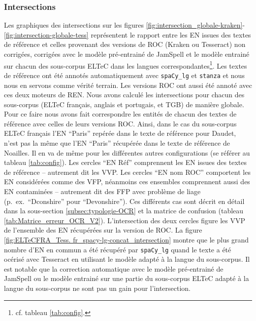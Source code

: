 \subsubsection{Intersections}
\label{intersections}
Les graphiques des intersections sur les figures \ref{fig:intersection_globale-kraken}-\ref{fig:intersection-globale-tess} représentent le rapport entre les EN issues des textes de référence et celles provenant des versions de ROC (Kraken ou Tesseract) non corrigées, corrigées avec le modèle pré-entrainé de JamSpell et le modèle entrainé sur chacun des sous-corpus ELTeC dans les langues correspondantes\footnote{cf. tableau \ref{tab:config}.}. Les textes de référence ont été annotés automatiquement avec \texttt{spaCy\_lg} et \texttt{stanza} et nous nous en servons comme vérité terrain. Les versions ROC ont aussi été annoté avec ces deux moteurs de REN. Nous avons calculé les intersections pour chacun des sous-corpus (ELTeC français, anglais et portugais, et TGB) de manière globale. Pour ce faire nous avons fait correspondre les entités de chacun des textes de référence avec celles de leurs versions ROC. Ainsi, dans le cas du sous-corpus ELTeC français l'EN ``Paris'' repérée dans le texte de référence pour Daudet, n'est pas la même que l'EN ``Paris'' récupérée dans le texte de référence de Noailles. Il en va de même pour les différentes autres configurations (se référer au tableau \ref{tab:config}).
Les cercles ``EN Réf'' comprennent les EN issues des textes de référence -- autrement dit les VVP. Les cercles ``EN nom ROC'' comportent les EN considérées comme des VFP, néanmoins ces ensembles comprennent aussi des EN contaminées -- autrement dit des FFP avec problème de liage (p.\ ex.\ ``Dconshire'' pour ``Devonshire''). Ces différents cas sont décrit en détail dans la sous-section \ref{subsec:typologie-OCR} et la matrice de confusion (tableau \ref{tab:Matrice_erreur_OCR_V2}). L'intersection des deux cercles figure les VVP de l'ensemble des EN récupérées sur la version de ROC.
La figure \ref{fig:ELTeCFRA_Tess. fr_spacy-lg-concat_intersection} montre que le plus grand nombre d'EN en commun a été récupéré par \texttt{spaCy\_lg} quand le texte a été océrisé avec Tesseract en utilisant le modèle adapté à la langue du sous-corpus. Il est notable que la correction automatique avec le modèle pré-entrainé de JamSpell ou le modèle entrainé sur une partie du sous-corpus ELTeC adapté à la langue du sous-corpus ne sont pas un gain pour l'intersection. 
